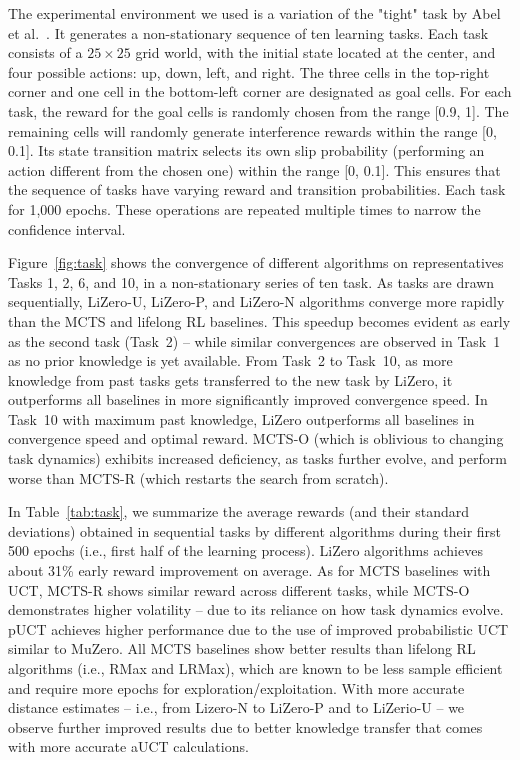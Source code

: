 The experimental environment we used is a variation of the "tight" task by Abel et al.~\cite{abel2018policy}. It generates a non-stationary sequence of ten learning tasks. Each task consists of a $25\times 25$ grid world, with the initial state located at the center, and four possible actions: up, down, left, and right.
The three cells in the top-right corner and one cell in the bottom-left corner are designated as goal cells. For each task, the reward for the goal cells is randomly chosen from the range [0.9, 1].
The remaining cells will randomly generate interference rewards within the range [0, 0.1].
Its state transition matrix selects its own slip probability (performing an action different from the chosen one) within the range [0, 0.1].
This ensures that the sequence of tasks have varying reward and transition probabilities.
Each task for 1,000 epochs. These operations are repeated multiple times to narrow the confidence interval.




Figure~\ref{fig:task} shows the convergence of different algorithms on representatives Tasks 1, 2, 6, and 10, in a non-stationary series of ten task. As tasks are drawn sequentially, LiZero-U, LiZero-P, and LiZero-N algorithms converge more rapidly than the MCTS and lifelong RL baselines. This speedup becomes evident as early as the second task (Task~2) -- while similar convergences are observed in Task~1 as no prior knowledge is yet available. From Task~2 to Task~10, as more knowledge from past tasks gets transferred to the new task by LiZero, it outperforms all baselines in more significantly improved convergence speed. In Task~10 with maximum past knowledge, LiZero outperforms all baselines in convergence speed and optimal reward. MCTS-O (which is oblivious to changing task dynamics) exhibits increased deficiency, as tasks further evolve, and perform worse than MCTS-R (which restarts the search from scratch).





In Table~\ref{tab:task}, we summarize the average rewards (and their standard deviations) obtained in sequential tasks by different algorithms during their first 500 epochs (i.e., first half of the learning process). LiZero algorithms achieves about 31\% early reward improvement on average. As for MCTS baselines with UCT, MCTS-R shows similar reward across different tasks, while MCTS-O demonstrates higher volatility -- due to its reliance on how task dynamics evolve. pUCT achieves higher performance due to the use of improved probabilistic UCT similar to MuZero. All MCTS baselines show better results than lifelong RL algorithms (i.e., RMax and LRMax), which are known to be less sample efficient and require more epochs for exploration/exploitation. With more accurate distance estimates – i.e., from Lizero-N to
LiZero-P and to LiZerio-U – we observe further improved results due to better knowledge transfer that comes with more accurate aUCT calculations.





